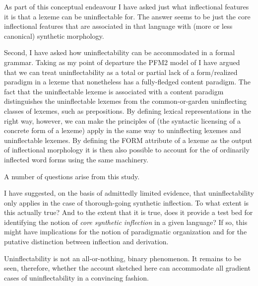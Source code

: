 \documentclass[output=paper,colorlinks,citecolor=brown]{langscibook}
\begin{document}
As part of this conceptual endeavour I have asked just what inflectional features it is that a lexeme can be uninflectable for. The answer seems to be just the core inflectional features that are associated in that language with (more or less canonical) synthetic morphology. 
	
	
Second, I have asked how uninflectability can be accommodated in  a formal grammar. Taking as my point of departure the PFM2 model of \citet{stump2016} I have argued that we can treat uninflectability as a total or partial lack of a form/realized paradigm in a lexeme that nonetheless has a fully-fledged content paradigm. The fact that the uninflectable lexeme is associated with a content paradigm distinguishes the uninflectable lexemes from the common-or-garden uninflecting classes of lexemes, such as  prepositions. By defining lexical representations in the right way, however, we can make the principles of  (the syntactic licensing of a concrete form of a lexeme) apply in the same way to uninflecting lexemes and uninflectable lexemes. By defining the FORM attribute of a lexeme as the output of inflectional morphology it is then also possible to account for the  of ordinarily inflected word forms using the same machinery. 

A number of questions arise from this study.

I have suggested, on the basis of admittedly limited evidence, that uninflectability only applies in the case of thorough-going synthetic inflection. To what extent is this actually true? And to the extent that it is true, does it provide a test bed for identifying the notion of \textit{core synthetic inflection} in a given language? If so, this might have implications for the notion of paradigmatic organization and for the putative distinction between inflection and derivation.

Uninflectability is not an all-or-nothing, binary phenomenon. It remains to be seen, therefore, whether the account sketched here can accommodate all gradient cases of uninflectability in a convincing fashion.
\end{document}
